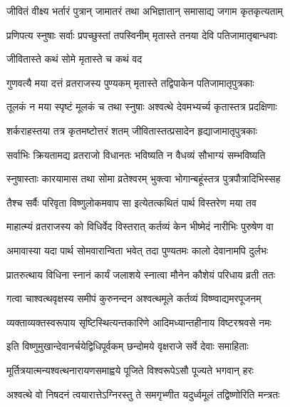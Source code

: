 \twolineshloka
{जीवितं वीक्ष्य भर्तारं पुत्रान् जामातरं तथा}
{अभिज्ञातान् समासाद्य जगाम कृतकृत्यताम्} %

\twolineshloka
{प्रणिपत्य स्नुषाः सर्वाः प्रपच्छुस्तां तपस्विनीम्}
{मृतास्ते तनया देवि पतिजामातृबान्धवाः} %

\onelineshloka
{जीवितास्ते कथं सोमे मृतास्ते च कथं वद} %


\twolineshloka
{गुणवत्यै मया दत्तं व्रतराजस्य पुण्यकम्}
{मृतास्ते तद्विपाकेन पतिजामातृपुत्रकाः} %

\twolineshloka
{तूलकं न मया स्पृष्टं मूलकं च तथा स्नुषाः}
{अश्वत्थे देवमभ्यर्च्य कृतास्तत्र प्रदक्षिणाः} %

\twolineshloka
{शर्कराहस्तया तत्र कृतमष्टोत्तरं शतम्}
{जीवितास्तत्प्रसादेन हृद्याजामातृपुत्रकाः} %

\twolineshloka
{सर्वाभिः क्रियतामद्य व्रतराजो विधानतः}
{भविष्यति न वैधव्यं सौभाग्यं सम्भविष्यति} %

\twolineshloka
{स्नुषास्ताः कारयामास तथा सोमा व्रतेश्वरम्}
{भुक्त्वा भोगान्बहूंस्तत्र पुत्रपौत्रादिभिस्सह} %

\twolineshloka
{तैश्च सर्वैः परिवृता विष्णुलोकमवाप सा}
{इत्येतत्कथितं पार्थ विस्तरेण मया तव} %


\twolineshloka
{माहात्म्यं व्रतराजस्य को विधिर्वेद विस्तरात्}
{कर्तव्यं केन भीष्मेदं नारीभिः पुरुषेण वा} %


\twolineshloka
{अमावास्या यदा पार्थ सोमवारान्विता भवेत्}
{तदा पुण्यतमः कालो देवानामपि दुर्लभः} %

\twolineshloka
{प्रातरुत्थाय विधिना स्नानं कार्यं जलाशये}
{स्नात्वा मौनेन कौशेयं परिधाय व्रती ततः} %

\twolineshloka
{गत्वा चाश्वत्थवृक्षस्य समीपं कुरुनन्दन}
{अश्वत्थमूले कर्तव्यं विष्ण्वाद्यमरपूजनम्} %

\twolineshloka
{व्यक्ताव्यक्तस्वरूपाय सृष्टिस्थित्यन्तकारिणे}
{आदिमध्यान्तहीनाय विष्टरश्रवसे नमः} %

\twolineshloka
{इति विष्णुमुखान्देवानर्चयेद्विधिपूर्वकम्}
{छन्दोमये वृक्षराजे सर्वे देवाः समाहिताः} %

\twolineshloka
{मूर्तित्रयात्मन्यश्वत्थनारायणसमाह्वये}
{पूजिते विश्वरूपेऽसौ पूज्यते भगवान् हरः} %

\twolineshloka
{अश्वत्थे वो निषदनं त्वयारात्तेऽग्निरस्तु ते}
{समगृभ्णीत यदुर्ध्वमूलं तद्विष्णोरिति मन्त्रतः} %

